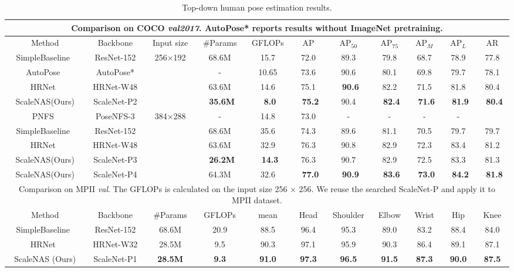 \documentclass[final]{cvpr}
\newcommand{\workname}{ScaleNAS\xspace}
\newcommand{\netname}{ScaleNet\xspace}
\begin{document}
\begin{table*}
\centering
\caption{Top-down human pose estimation results.
}
\small
\begin{tabular}{c||c|c|c|c|c|c|c|c|c|c} 
\hline
\multicolumn{11}{c}{\footnotesize{Comparison on COCO \textit{val2017}. AutoPose* reports results without ImageNet pretraining.}} \\
\hline
Method & Backbone & Input size  & \#Params & GFLOPs & AP & AP$_{50}$  & AP$_{75}$  & AP$_{M}$  & AP$_{L}$  & AR \\ 
\hline 
SimpleBaseline~\cite{xiao2018simple}  & ResNet-152       & \multirow{4}{*}{256$\times$192} & 68.6M    & 15.7   & 72.0 & 89.3      & 79.8      & 68.7     & 78.9     & 77.8 \\
AutoPose~\cite{gong2020autopose}   & AutoPose*       &  & -    & 10.65   & 73.6 & 90.6      & 80.1      & 69.8     & 79.7     & 78.1 \\
HRNet~\cite{wang2020deep}           & HRNet-W48        &  & 63.6M    & 14.6   & 75.1 & ~\textbf{90.6}      & 82.2      & 71.5     & 81.8     & 80.4 \\
\workname(Ours) & \netname-P2  &  & ~\textbf{35.6M}    & ~\textbf{8.0}    & ~\textbf{75.2} & 90.4      & ~\textbf{82.4}      & ~\textbf{71.6}     & ~\textbf{81.9}     & ~\textbf{80.4} \\
\hline
PNFS~\cite{yang2019pose}   & PoseNFS-3       & \multirow{5}{*}{384$\times$288} & -    & 14.8    & 73.0 & -      & -      & -     & -    &  \\
SimpleBaseline~\cite{xiao2018simple}  & ResNet-152       &  & 68.6M    & 35.6   & 74.3 & 89.6      & 81.1      & 70.5     & 79.7     & 79.7 \\
HRNet~\cite{wang2020deep}          & HRNet-W48        &   & 63.6M    & 32.9   & 76.3 & 90.8      & 82.9      & 72.3     & 83.4     & 81.2 \\
\workname(Ours) & \netname-P3  &  & ~\textbf{26.2M}    & ~\textbf{14.3}   & 76.3 & 90.7      & 82.9      & 72.5     & 83.3     & 81.3  \\
\workname(Ours) & \netname-P4 &  & 64.3M    & 32.6   & ~\textbf{77.0} & ~\textbf{90.9}      & ~\textbf{83.6}      & ~\textbf{73.0}     & ~\textbf{84.2}     & ~\textbf{81.8}  \\
\hline
\hline
\multicolumn{11}{c}{\footnotesize{Comparison on MPII \textit{val}. The GFLOPs is calculated on the input size 256 × 256. We reuse the searched \netname-P and apply it to MPII dataset.}} \\
\hline
Method  & Backbone & \#Params & GFLOPs  & mean &Head & Shoulder & Elbow &  Wrist & Hip & Knee     \\ 
\hline 
SimpleBaseline~\cite{xiao2018simple} & ResNet-152 & 68.6M & 20.9 & 88.5 & 96.4 & 95.3  & 89.0  & 83.2 & 88.4 & 84.0\\
HRNet~\cite{wang2020deep} & HRNet-W32 & 28.5M &  9.5 & 90.3 & 97.1 & 95.9 & 90.3 & 86.4 & 89.1 & 87.1\\
ScaleNAS (Ours) & \netname-P1 &  \textbf{28.5M} & \textbf{9.3} &\textbf{91.0} & \textbf{97.3}  & \textbf{96.5} & \textbf{91.5} & \textbf{87.3} & \textbf{90.0} & \textbf{87.5} \\


\end{tabular}
\end{table*}
\end{document}
